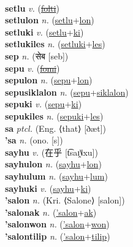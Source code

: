 \label{setak} \\
\textbf{setlu} \textit{v.} (\hyperref[folti]{\sout{folti}})
 \label{setlu} \\
\textbf{setlulon} \textit{n.} (\hyperref[setlu]{setlu}+\hyperref[lon]{lon})
 \label{setlulon} \\
\textbf{setluki} \textit{v.} (\hyperref[setlu]{setlu}+\hyperref[ki]{ki})
 \label{setluki} \\
\textbf{setlukiles} \textit{n.} (\hyperref[setluki]{setluki}+\hyperref[les]{les})
 \label{setlukiles} \\
\textbf{sep} \textit{n.} ({\devanagari{}सेब} [seb])
 \label{sep} \\
\textbf{sepu} \textit{v.} (\hyperref[fomi]{\sout{fomi}})
 \label{sepu} \\
\textbf{sepulon} \textit{n.} (\hyperref[sepu]{sepu}+\hyperref[lon]{lon})
 \label{sepulon} \\
\textbf{sepusiklalon} \textit{n.} (\hyperref[sepu]{sepu}+\hyperref[siklalon]{siklalon})
 \label{sepusiklalon} \\
\textbf{sepuki} \textit{v.} (\hyperref[sepu]{sepu}+\hyperref[ki]{ki})
 \label{sepuki} \\
\textbf{sepukiles} \textit{n.} (\hyperref[sepuki]{sepuki}+\hyperref[les]{les})
 \label{sepukiles} \\
\textbf{sa} \textit{ptcl.} (Eng. ⟨that⟩ [ðæt])
 \label{sa} \\
\textbf{'sa} \textit{n.} (ono. [s])
 \label{'sa} \\
\textbf{sayhu} \textit{v.} ({\chinese{}在乎} [t͡saɪ̯˥˩xu])
 \label{sayhu} \\
\textbf{sayhulon} \textit{n.} (\hyperref[sayhu]{sayhu}+\hyperref[lon]{lon})
 \label{sayhulon} \\
\textbf{sayhulum} \textit{n.} (\hyperref[sayhu]{sayhu}+\hyperref[lum]{lum})
 \label{sayhulum} \\
\textbf{sayhuki} \textit{v.} (\hyperref[sayhu]{sayhu}+\hyperref[ki]{ki})
 \label{sayhuki} \\
\textbf{'salon} \textit{n.} (Kri. ⟨Salone⟩ [salon])
 \label{'salon} \\
\textbf{'salonak} \textit{n.} (\hyperref['salon]{'salon}+\hyperref[ak]{ak})
 \label{'salonak} \\
\textbf{'salonwon} \textit{n.} (\hyperref['salon]{'salon}+\hyperref[won]{won})
 \label{'salonwon} \\
\textbf{'salontilip} \textit{n.} (\hyperref['salon]{'salon}+\hyperref[tilip]{tilip})
 \label{'salontilip} \\
